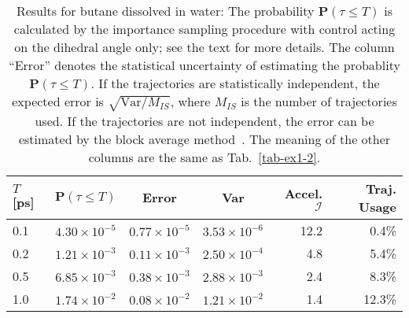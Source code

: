\documentclass[final]{siamltex}
\newcommand{\cI}{{\mathcal I}}
\newcommand{\bP}{{\mathbf P}}
\begin{document}
\begin{table}[t]
  \centering
  \caption{
    Results for butane dissolved in water: The probability
    $\bP (\tau \leq T)$ is calculated by the importance sampling procedure with
    control acting on the dihedral angle only; see the text for more details.
    The column ``Error'' denotes the statistical uncertainty of
    estimating the probablity $\bP (\tau \leq T)$.
    If the  trajectories are statistically independent, the expected error is $\sqrt{\textrm{Var}/M_{IS}}$, where
    $M_{IS}$ is the number of trajectories used. If the trajectories are not independent, the error
    can be estimated by the block average method~\cite{frenkel2001understanding}.
    The meaning of the other columns are the same as Tab.~\ref{tab-ex1-2}. 
  }
  \label{tab:tmp1}
  \begin{tabular*}{0.9\textwidth}{@{\extracolsep{\fill}}lcccrr}
    \hline\hline
    $T$ [ps] & $\bP (\tau \leq T)$ & Error & Var & Accel. $\cI$ & Traj. Usage \\\hline
    0.1 & $4.30\times 10^{-5}$ & $0.77\times 10^{-5}$ & $3.53\times10^{-6}$ & 12.2 & 0.4\%\\
    0.2 & $1.21\times 10^{-3}$ & $0.11\times 10^{-3}$ & $2.50\times10^{-4}$ & 4.8 & 5.4\%\\
    0.5 & $6.85\times 10^{-3}$ & $0.38\times 10^{-3}$ & $2.88\times10^{-3}$ & 2.4 & 8.3\%\\
    1.0 & $1.74\times 10^{-2}$ & $0.08\times 10^{-2}$ & $1.21\times10^{-2}$ & 1.4 &12.3\%\\
    \hline\hline
  \end{tabular*}


\end{table}
\end{document}
